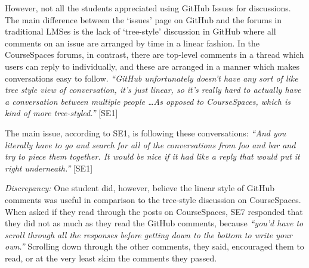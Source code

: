 However, not all the students appreciated using GitHub Issues for discussions. The main difference between the `issues' page on GitHub and the forums in traditional LMSes is the lack of `tree-style' discussion in GitHub where all comments on an issue are arranged by time in a linear fashion. In the CourseSpaces forums, in contrast, there are top-level comments in a thread which users can reply to individually, and these are arranged in a manner which makes conversations easy to follow. \textit{``GitHub unfortunately doesn't have any sort of like tree style view of conversation, it's just linear, so it's really hard to actually have a conversation between multiple people \ldots As opposed to CourseSpaces, which is kind of more tree-styled.''} [SE1]

The main issue, according to SE1, is following these conversations: \textit{``And you literally have to go and search for all of the conversations from foo and bar and try to piece them together. It would be nice if it had like a reply that would put it right underneath.''} [SE1]


\emph{Discrepancy:} One student did, however, believe the linear style of GitHub comments was useful in comparison to the tree-style discussion on CourseSpaces. When asked if they read through the posts on CourseSpaces, SE7 responded that they did not as much as they read the GitHub comments, because \textit{``you'd have to scroll through all the responses before getting down to the bottom to write your own.''} Scrolling down through the other comments, they said, encouraged them to read, or at the very least skim the comments they passed. %


